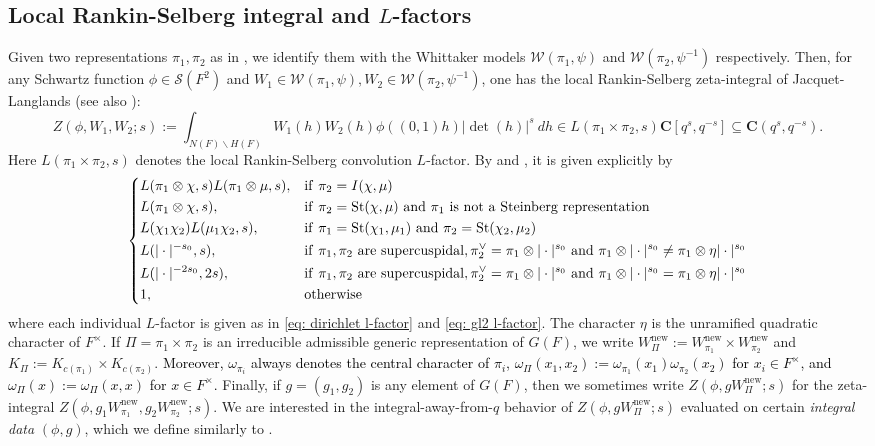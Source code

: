 \documentclass{amsart}
\theoremstyle{plain}
\theoremstyle{plain}
\theoremstyle{remark}
\begin{document}
\subsection{Local Rankin-Selberg integral and $L$-factors} Given two representations $\pi_1,\pi_2$ as in , we identify them with the Whittaker models $\mathcal{W}(\pi_1,\psi)$ and $\mathcal{W}(\pi_2,\psi^{-1})$ respectively. Then, for any Schwartz function $\phi\in\mathcal{S}(F^2)$ and $W_1\in\mathcal{W}(\pi_1,\psi), W_2\in \mathcal{W}(\pi_2,\psi^{-1})$, one has the local Rankin-Selberg zeta-integral of Jacquet-Langlands (see also \cite{jacquet1983rankin}):
$$Z(\phi,W_1,W_2;s):=\int_{N(F)\backslash H(F)}W_1(h)W_2(h)\phi((0,1)h)|\det(h)|^s\ dh\in L(\pi_1\times \pi_2,s)\mathbf{C}[q^s,q^{-s}]\subseteq \mathbf{C}(q^s,q^{-s}).$$
Here $L(\pi_1\times \pi_2,s)$ denotes the local Rankin-Selberg convolution $L$-factor. By \cite{automorphic_on_GL_II} and \cite{gelbart1976relation}, it is given explicitly by 
\begin{align}
   \begin{dcases}
       L(\pi_1\otimes\chi,s)L(\pi_1\otimes \mu,s),& \mathrm{if}\ \pi_2=I(\chi,\mu)\\
       L(\pi_1\otimes \chi,s),& \mathrm{if}\ \pi_2=\mathrm{St}(\chi,\mu)\ \mathrm{and}\ \pi_1\ \mathrm{is}\ \mathrm{not}\ \mathrm{a}\ \mathrm{Steinberg}\ \mathrm{representation}\\
       L(\chi_1\chi_2)L(\mu_1\chi_2,s),& \mathrm{if}\ \pi_1=\mathrm{St}(\chi_1,\mu_1)\ \mathrm{and}\ \pi_2=\mathrm{St}(\chi_2,\mu_2)\\
       L(|\cdot|^{-s_0},s),&\mathrm{if}\ \pi_1,\pi_2\ \mathrm{are}\ \mathrm{supercuspidal}, \pi_2^\vee=\pi_1\otimes|\cdot|^{s_0}\ \mathrm{and}\ \pi_1\otimes|\cdot|^{s_0}\neq \pi_1\otimes\eta|\cdot|^{s_0}\\
       L(|\cdot|^{-2s_0},2s),&\mathrm{if}\ \pi_1,\pi_2\ \mathrm{are}\ \mathrm{supercuspidal}, \pi_2^\vee=\pi_1\otimes|\cdot|^{s_0} \ \mathrm{and}\ \pi_1\otimes|\cdot|^{s_0}= \pi_1\otimes\eta|\cdot|^{s_0}\\
       1 ,& \mathrm{otherwise}
    \end{dcases}
\end{align}
where each individual $L$-factor is given as in \eqref{eq: dirichlet l-factor} and \eqref{eq: gl2 l-factor}. The character $\eta$ is the unramified quadratic character of $F^\times$. If $\Pi=\pi_1\times\pi_2$ is an irreducible admissible generic representation of $G(F)$, we write $W_\Pi^\mathrm{new}:=W_{\pi_1}^\mathrm{new}\times W_{\pi_2}^\mathrm{new}$ and $K_\Pi:=K_{c(\pi_1)}\times K_{c(\pi_2)}$. \textcolor{black}{Moreover, $\omega_{\pi_i}$ always denotes the central character of $\pi_i$, $\omega_\Pi(x_1,x_2):=\omega_{\pi_1}(x_1)\omega_{\pi_2}(x_2)$ for $x_i\in F^\times$, and $\omega_\Pi(x):=\omega_\Pi(x,x)$ for $x\in F^\times.$} Finally, if $g=(g_1,g_2)$ is any element of $G(F)$, then we sometimes write $Z(\phi,gW_\Pi^\mathrm{new};s)$ for the zeta-integral $Z(\phi,g_1W_{\pi_1}^\mathrm{new},g_2W_{\pi_2}^\mathrm{new};s)$. We are interested in the integral-away-from-$q$ behavior of $Z(\phi,gW_\Pi^\mathrm{new};s)$ evaluated on certain \textit{integral data} $(\phi,g)$, which we define similarly to \cite[\S $6.4$]{loeffler2021zetaintegralsunramifiedrepresentationsgsp4}.
\end{document}

